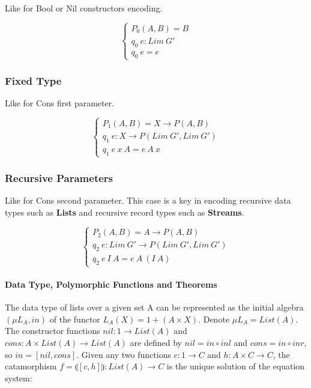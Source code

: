 \documentclass[11pt,oneside]{article}
\begin{document}
Like for Bool or Nil constructors encoding.

$$
\begin{cases}
P_0(A,B) =  B \\
q_0\ e : Lim\ G' \\
q_0\ e = e
\end{cases}
$$

\subsubsection{Fixed Type}

Like for Cons first parameter.

$$
\begin{cases}
P_1(A,B) = X \rightarrow P(A,B) \\
q_1\ e : X \rightarrow P ( Lim\ G',  Lim\ G' ) \\
q_1\ e\ x\ A = e\ A\ x
\end{cases}
$$

\subsubsection{Recursive Parameters}

Like for Cons second parameter. This case is a key in encoding recursive
   data types such as {\bf Lists} and recursive record types such as {\bf Streams}.

$$
\begin{cases}
P_2(A,B) = A \rightarrow P(A,B) \\
q_2\ e : Lim\ G' \rightarrow P ( Lim\ G',  Lim\ G' ) \\
q_2\ e\ I\ A = e\ A\ (I\ A)
\end{cases}
$$

\newpage
  \paragraph{Data Type, Polymorphic Functions and Theorems}
  The data type of lists over a given set A can be represented as the initial algebra
  $(\mu L_A, in)$ of the functor $L_A(X) = 1 + (A \times X)$. Denote $\mu L_A = List(A)$.
  The constructor functions $nil: 1 \rightarrow List(A)$ and
  $cons: A \times List(A) \rightarrow List(A)$ are defined by
  $nil = in \circ inl$ and $cons = in \circ inr$, so $in = [nil,cons]$.
  Given any two functions $c: 1 \rightarrow C$ and $h: A \times C \rightarrow C$,
  the catamorphism $f = \llparenthesis [c,h] \rrparenthesis : List(A) \rightarrow C$
  is the unique solution of the equation system:
\end{document}
